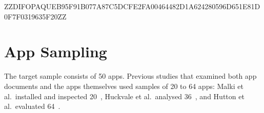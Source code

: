 \documentclass[twoside,its]{bossthesis}
\begin{document}
%
%
%


ZZDIFOPAQUEB95F91B077A87C5DCFE2FA00464482D1A624280596D651E81D0F7F0319635F20ZZ



\section{App Sampling}
\label{sec:app-sampling}
The target sample consists of 50 apps. Previous studies that examined both
app documents and the apps themselves used samples of 20 to 64 apps:
Malki et al.\ installed and inspected 20~\parencite{malki2024exploring},
Huckvale et al.\ analysed 36~\parencite{huckvale2019assessment}, and
Hutton et al.\ evaluated 64~\parencite{hutton2018assessing}.
\end{document}
